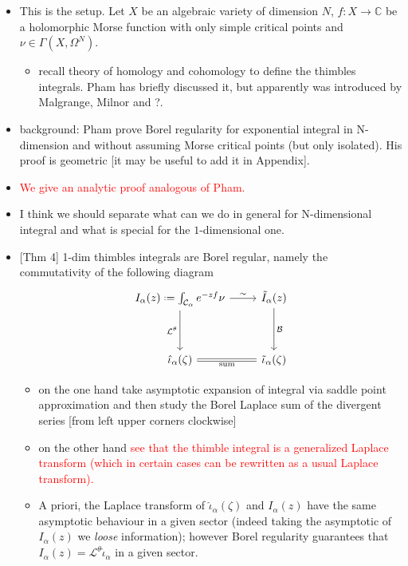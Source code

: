 \documentclass{article}
\newcommand*{\defeq}{\mathrel{\vcenter{\baselineskip0.5ex \lineskiplimit0pt
                     \hbox{\scriptsize.}\hbox{\scriptsize.}}}%
                     =}
\begin{document}
\begin{itemize}
\begin{itemize}
\item This is the setup. Let $X$ be an algebraic variety of dimension $N$, $f\colon X\to \mathbb{C}$ be a holomorphic Morse function with only simple critical points and $\nu\in\Gamma(X,\Omega^N)$.
\begin{itemize}
\item recall theory of homology and cohomology to define the thimbles integrals. Pham has briefly discussed it, but apparently was introduced by Malgrange, Milnor and ?.  
\end{itemize} 
\item background: Pham prove Borel regularity for exponential integral in N-dimension and without assuming Morse critical points (but only isolated). His proof is geometric [it may be useful to add it in Appendix]. 
\item \textcolor{red}{We give an analytic proof analogous of Pham.}
\item I think we should separate what can we do in general for N-dimensional integral and what is special for the $1$-dimensional one. 
\item {[Thm 4]} 1-dim thimbles integrals are Borel regular, namely the commutativity of the following diagram
\begin{equation}
\begin{tikzcd}
I_{\alpha}(z)\defeq\int_{\mathcal{C}_\alpha}e^{-zf}\nu \arrow[r,"\sim"]\arrow[dd, swap, "\mathcal{L}^\theta "] & \tilde{I}_{\alpha}(z)\arrow[dd,"\mathcal{B}"]\\
& \\
\hat{\iota}_\alpha(\zeta)\arrow[r,equal,swap, "\text{sum}"] & \tilde{\iota}_{\alpha}(\zeta) 
\end{tikzcd}
\end{equation}
\begin{itemize}
\item on the one hand take asymptotic expansion of integral via saddle point approximation and then study the Borel Laplace sum of the divergent series [from left upper corners clockwise]
\item on the other hand \textcolor{red}{see that the thimble integral is a generalized Laplace transform (which in certain cases can be rewritten as a usual Laplace transform).}
\item A priori, the Laplace transform of $\hat{\iota}_\alpha(\zeta)$ and $I_{\alpha}(z)$ have the same asymptotic behaviour in a given sector (indeed taking the asymptotic of $I_\alpha(z)$ we \textit{loose} information); however Borel regularity guarantees that $I_{\alpha}(z)=\mathcal{L}^{\theta}\hat{\iota}_{\alpha}$ in a given sector.

\end{itemize}
\end{itemize}
\end{itemize}
\end{document}
